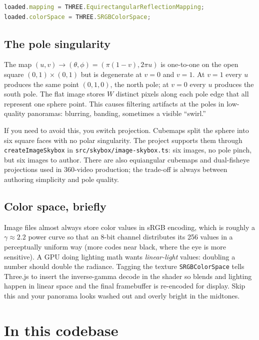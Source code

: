 \documentclass{article}
\begin{document}
\begin{lstlisting}[language=JavaScript]
loaded.mapping = THREE.EquirectangularReflectionMapping;
loaded.colorSpace = THREE.SRGBColorSpace;
\end{lstlisting}

\subsection{The pole singularity}

The map $(u, v) \to (\theta, \phi) = (\pi(1-v), 2\pi u)$ is one-to-one on the
open square $(0, 1) \times (0, 1)$ but is degenerate at $v = 0$ and $v = 1$.
At $v = 1$ every $u$ produces the same point $(0, 1, 0)$, the north pole;
at $v = 0$ every $u$ produces the south pole. The flat image stores $W$
distinct pixels along each pole edge that all represent one sphere point.
This causes filtering artifacts at the poles in low-quality panoramas:
blurring, banding, sometimes a visible ``swirl.''

If you need to avoid this, you switch projection. Cubemaps split the sphere
into six square faces with no polar singularity. The project supports them
through \texttt{createImageSkybox} in \texttt{src/skybox/image-skybox.ts}:
six images, no pole pinch, but six images to author. There are also
equiangular cubemaps and dual-fisheye projections used in 360-video
production; the trade-off is always between authoring simplicity and pole
quality.

\subsection{Color space, briefly}

Image files almost always store color values in sRGB encoding, which is
roughly a $\gamma \approx 2.2$ power curve so that an 8-bit channel
distributes its 256 values in a perceptually uniform way (more codes near
black, where the eye is more sensitive). A GPU doing lighting math wants
\emph{linear-light} values: doubling a number should double the radiance.
Tagging the texture \texttt{SRGBColorSpace} tells Three.js to insert the
inverse-gamma decode in the shader so blends and lighting happen in linear
space and the final framebuffer is re-encoded for display. Skip this and
your panorama looks washed out and overly bright in the midtones.

\section{In this codebase}
\end{document}
